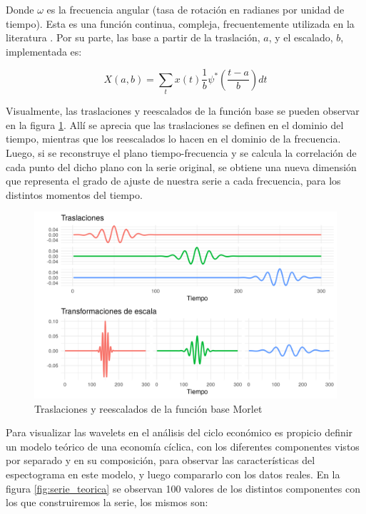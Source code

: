 \documentclass[a4paper]{article}
\begin{document}
Donde $\omega$ es la frecuencia angular (tasa de rotación en radianes por unidad de tiempo). Esta es una función continua, compleja, frecuentemente utilizada en la literatura \citep{conraria2011continuous}. Por su parte, las base a partir de la traslación, $a$, y el escalado, $b$, implementada es:

$$
X(a,b)=\sum_{t} x(t)   \frac{1}{b} \psi^*\left(\frac{t-a}{b}\right)dt
$$

Visualmente, las traslaciones y reescalados de la función base se pueden observar en la figura \ref{fig:morlet}. Allí se aprecia que las traslaciones se definen en el dominio del tiempo, mientras que los reescalados lo hacen en el dominio de la frecuencia. Luego, si se reconstruye el plano tiempo-frecuencia y se calcula la correlación de cada punto del dicho plano con la serie original, se obtiene una nueva dimensión que representa el grado de ajuste de nuestra serie a cada frecuencia, para los distintos momentos del tiempo. 

\begin{figure}[H]
	\centering
	\includegraphics[width=\linewidth]{morelt.png}
	\caption{Traslaciones y reescalados de la función base Morlet} \label{fig:morlet}
\end{figure}

Para visualizar las wavelets en el análisis del ciclo económico es propicio definir un modelo teórico de una economía cíclica, con los diferentes componentes vistos por separado y en su composición, para observar las características del espectograma en este modelo,  y luego compararlo con los datos reales. 
En la figura \ref{fig:serie_teorica} se observan 100 valores de los distintos componentes con los que construiremos la serie, los mismos son:
\end{document}
